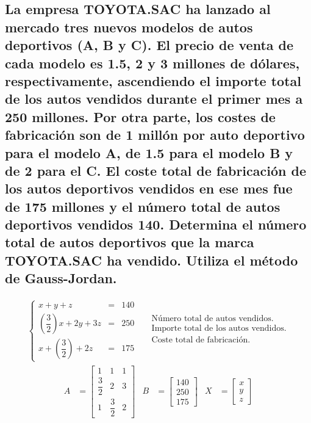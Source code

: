 \documentclass[10pt, a4paper]{article}
\begin{document}
\subsection{La empresa TOYOTA.SAC ha lanzado al mercado tres nuevos modelos de autos deportivos (A, B y C). El precio de venta de cada modelo es 1.5, 2 y 3 millones de dólares, respectivamente, ascendiendo el importe total de los autos vendidos durante el primer mes a 250 millones. Por otra parte, los costes de fabricación son de 1 millón por auto deportivo para el modelo A, de 1.5 para el modelo B y de 2 para el C. El coste total de fabricación de los autos deportivos vendidos en ese mes fue de 175 millones y el número total de autos deportivos vendidos 140. Determina el número total de autos deportivos que la marca TOYOTA.SAC ha vendido. Utiliza el método de Gauss-Jordan.}
  \begin{align*}
    \left\{
    \begin{array}{rcl}
      x + y + z &= &140\\
      \left(\dfrac{3}{2}\right)x + 2y + 3z &= &250\\
      x + \left(\dfrac{3}{2}\right) + 2z &= &175
    \end{array}
    \right.\
    \quad
    \begin{array}{l}
      \text{Número total de autos vendidos.}\\[2ex]
      \text{Importe total de los autos vendidos.}\\[2ex]
      \text{Coste total de fabricación.}\\[2ex]
    \end{array}
  \end{align*}
  \begin{align*}
    A &= \begin{bmatrix}
      1 & 1 & 1\\[2ex]
      \dfrac{3}{2} & 2 & 3\\[2ex]
      1 & \dfrac{3}{2} & 2
    \end{bmatrix}&
    B &= \begin{bmatrix}
      140\\[2ex]
      250\\[2ex]
      175
    \end{bmatrix}&
    X &= \begin{bmatrix}
      x\\[2ex]
      y\\[2ex]
      z
    \end{bmatrix}
  \end{align*}
\end{document}
